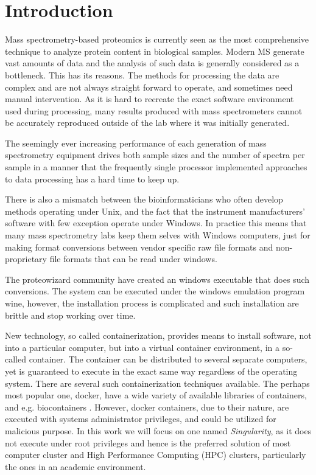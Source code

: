 \documentclass[11pt]{article}
\begin{document}
\section*{Introduction}
Mass spectrometry-based proteomics is currently seen as the most comprehensive technique to analyze protein content in biological samples. Modern MS generate vast amounts of data and the analysis of such data is generally considered as a bottleneck. This has its reasons. The methods for processing the data are complex and are not always straight forward to operate, and sometimes need manual intervention. As it is hard to recreate the exact software environment used during processing, many results produced with mass spectrometers cannot be accurately reproduced outside of the lab where it was initially generated.

The seemingly ever increasing performance of each generation of mass spectrometry equipment drives both sample sizes and the number of spectra per sample in a manner that the frequently single processor implemented approaches to data processing has a hard time to keep up.

There is also a mismatch between the bioinformaticians who often develop methods operating under Unix, and the fact that the instrument manufacturers' software with few exception operate under Windows. In practice this means that many mass spectrometry labs keep them selves with Windows computers, just for making format conversions between vendor specific raw file formats and non-proprietary file formats that can be read under windows.

The proteowizard community have created an windows executable that does such conversions. The system can be executed under the windows emulation program wine, however, the installation process is complicated and such installation are brittle and stop working over time.

New technology, so called containerization, provides means to install software, not into a particular computer, but into a virtual container environment, in a so-called container. The container can be distributed to several separate computers, yet is guaranteed to execute in the exact same way regardless of the operating system. There are several such containerization techniques available. The perhaps most popular one, docker, have a wide variety of available libraries of containers, and e.g. biocontainers \cite{}. However, docker containers, due to their nature, are executed with systems administrator privileges, and could be utilized for malicious purpose.  In this work we will focus on one named \textit{Singularity}, as it does not execute under root privileges and hence is the preferred solution of most computer cluster and High Performance Computing (HPC) clusters, particularly the ones in an academic environment.
\end{document}
